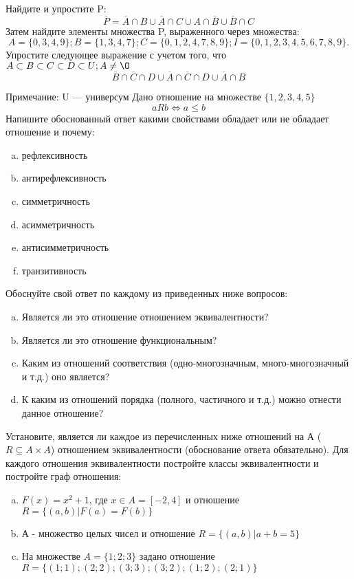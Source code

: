\documentclass[10pt]{exam}
\begin{document}
\begin{questions}
\question
Найдите и упростите P:
\begin{equation*}
\overline{P} = \overline{A} \cap B \cup \overline{A} \cap C \cup A \cap \overline{B} \cup \overline{B} \cap C
\end{equation*}
Затем найдите элементы множества P, выраженного через множества:
\begin{equation*}
A = \{0, 3, 4, 9\}; 
B = \{1, 3, 4, 7\};
C = \{0, 1, 2, 4, 7, 8, 9\};
I = \{0, 1, 2, 3, 4, 5, 6, 7, 8, 9\}.
\end{equation*}\question
Упростите следующее выражение с учетом того, что $A\subset B \subset C \subset D \subset U; A \neq \O$
\begin{equation*}
\overline{B} \cap \overline{C} \cap D \cup \overline{A} \cap \overline{C} \cap D \cup \overline{A} \cap B
\end{equation*}

Примечание: U — универсум\question
Дано отношение на множестве $\{1, 2, 3, 4, 5\}$ 
\begin{equation*}
aRb \iff a \leq b
\end{equation*}
Напишите обоснованный ответ какими свойствами обладает или не обладает отношение и почему:   
\begin{enumerate} [a)]\setcounter{enumi}{0}
\item рефлексивность
\item антирефлексивность
\item симметричность
\item асимметричность
\item антисимметричность
\item транзитивность
\end{enumerate}

Обоснуйте свой ответ по каждому из приведенных ниже вопросов:
\begin{enumerate} [a)]\setcounter{enumi}{0}
    \item Является ли это отношение отношением эквивалентности?
    \item Является ли это отношение функциональным?
    \item Каким из отношений соответствия (одно-многозначным, много-многозначный и т.д.) оно является?
    \item К каким из отношений порядка (полного, частичного и т.д.) можно отнести данное отношение?
\end{enumerate}


\question
Установите, является ли каждое из перечисленных ниже отношений на А ($R \subseteq A \times A$) отношением эквивалентности (обоснование ответа обязательно). Для каждого отношения эквивалентности постройте классы эквивалентности и постройте граф отношения:
\begin{enumerate} [a)]\setcounter{enumi}{0}
\item $F(x)=x^{2}+1$, где $x \in A = [-2, 4]$ и отношение $R = \{(a,b)|F(a) = F(b)\}$
\item А - множество целых чисел и отношение $R = \{(a,b)|a + b = 5\}$
\item На множестве $A = \{1; 2; 3\}$ задано отношение $R = \{(1; 1); (2; 2); (3; 3); (3; 2); (1; 2); (2; 1)\}$


\end{enumerate}
\end{questions}
\end{document}
